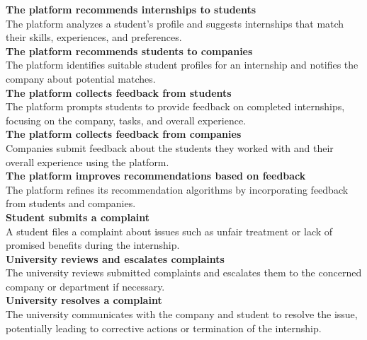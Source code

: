 \textbf{The platform recommends internships to students}\\
The platform analyzes a student’s profile and suggests internships that match their skills, experiences, and preferences.\\

\textbf{The platform recommends students to companies}\\
The platform identifies suitable student profiles for an internship and notifies the company about potential matches.\\

\textbf{The platform collects feedback from students}\\
The platform prompts students to provide feedback on completed internships, focusing on the company, tasks, and overall experience.\\

\textbf{The platform collects feedback from companies}\\
Companies submit feedback about the students they worked with and their overall experience using the platform.\\

\textbf{The platform improves recommendations based on feedback}\\
The platform refines its recommendation algorithms by incorporating feedback from students and companies.\\

\textbf{Student submits a complaint}\\
A student files a complaint about issues such as unfair treatment or lack of promised benefits during the internship.\\

\textbf{University reviews and escalates complaints}\\
The university reviews submitted complaints and escalates them to the concerned company or department if necessary.\\

\textbf{University resolves a complaint}\\
The university communicates with the company and student to resolve the issue, potentially leading to corrective actions or termination of the internship.\\